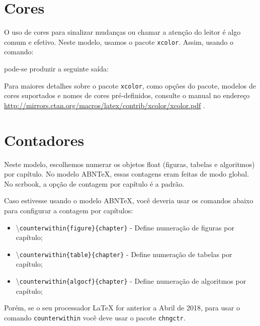 \section{Cores}

O uso de cores para sinalizar mudanças ou chamar a atenção do leitor é algo comum e efetivo. Neste modelo, usamos o pacote \texttt{xcolor}. Assim, usando o comando: 


\noindent pode-se produzir a seguinte saída:


Para maiores detalhes sobre o pacote \texttt{xcolor}, como opções do pacote, modelos de cores suportados e nomes de cores pré-definidos, consulte o manual no endereço \url{http://mirrors.ctan.org/macros/latex/contrib/xcolor/xcolor.pdf} \parencite{xcolor}.

\section{Contadores}

Neste modelo, escolhemos numerar os objetos float (figuras, tabelas e algoritmos) por capítulo. No modelo ABN\TeX{}, essas contagens eram feitas de modo global. No \gls{scrbook}, a opção de contagem por capítulo é a padrão. 

Caso estivesse usando o modelo ABN\TeX{}, você deveria usar os comandos abaixo para configurar a contagem por capítulos:

\begin{itemize}
	\item 
	\textbackslash \texttt{counterwithin\{figure\}\{chapter\}} - Define numeração de figuras por capítulo;
    \item \textbackslash \texttt{counterwithin\{table\}\{chapter\}} - Define numeração de tabelas por capítulo;
    \item \textbackslash \texttt{counterwithin\{algocf\}\{chapter\}} - Define numeração de algoritmos por capítulo;
\end{itemize}

Porém, se o seu processador \LaTeX{} for anterior a Abril de 2018, para usar o comando \texttt{counterwithin} você deve usar o pacote \texttt{chngctr}.

